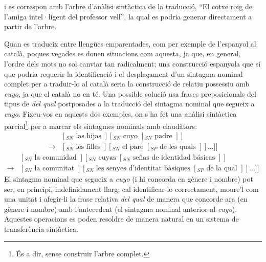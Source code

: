 i es correspon amb l'arbre d'anàlisi sintàctica de la traducció, ``El
cotxe roig de l'amiga intel·ligent del professor vell'', la qual es
podria generar directament a partir de l'arbre.

Quan es tradueix entre llengües emparentades, com per exemple de
l'espanyol al català, poques vegades es donen situacions com aquesta,
ja que, en general, l'ordre dels mots no sol canviar tan radicalment;
una construcció espanyola que sí que podria requerir la identificació
i el desplaçament d'un sintagma nominal complet per a traduir-lo al
català seria la construcció de relatiu possessiu amb \emph{cuyo}, ja
que el català no en té. Una possible solució usa frases preposicionals
del tipus de \emph{del qual} postposades a la traducció del sintagma
nominal que segueix a \emph{cuyo}. Fixeu-vos en aquests dos exemples,
on s'ha fet una anàlisi sintàctica parcial\footnote{És a dir, sense
  construir l'arbre complet.}  per a marcar els sintagmes nominals amb
claudàtors:
$$\begin{array}{ll}
& [_{SN} \mbox{ las hijas }] [_{SN} \mbox{ cuyo } [_{SN} \mbox{ padre } ] ] 
\\ \rightarrow  &
[_{SN} \mbox{ les filles } ] [_{SN}
\mbox{ el pare } [_{SP} \mbox{ de les quals } ] ] \ldots ] ] 
\end{array}
$$
$$
\begin{array}{ll}
& [_{SN} \mbox{ la comunidad }] [_{SN} \mbox{ cuyas } [_{SN} \mbox{ se\~{n}as de
identidad básicas } ] ]
\\ \rightarrow &
[_{SN} \mbox{ la comunitat }] [_{SN}
\mbox{ les senyes d'identitat bàsiques } [_{SP} \mbox{ de la qual } ] ] \ldots ] ] 
\end{array}
$$
El sintagma nominal que segueix a \emph{cuyo} (i hi concorda en gènere
i nombre) pot ser, en principi, indefinidament llarg; cal
identificar-lo correctament, moure'l com una unitat i afegir-li la
frase relativa {\em del qual} de manera que concorde ara (en gènere i
nombre) amb l'antecedent (el sintagma nominal anterior al
\emph{cuyo}). Aquestes operacions es poden resoldre de manera natural
en un sistema de transferència sintàctica.

